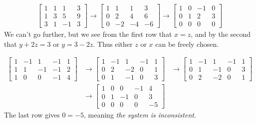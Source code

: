 \documentclass[a4paper,norsk,12pt]{article}
\begin{document}
\begin{align*}
    \left[
      \begin{array}{rrr|r}
        1 &  1 &  1 &  3 \\
        1 &  3 &  5 &  9 \\
        3 &  1 & -1 &  3
      \end{array}
    \right]
    \rightarrow
    \left[
      \begin{array}{rrr|r}
        1 &  1 &  1 &  3 \\
        0 &  2 &  4 &  6 \\
        0 & -2 & -4 & -6
      \end{array}
    \right]
    \rightarrow
    \left[
      \begin{array}{rrr|r}
        1 &  0 & -1 &  0 \\
        0 &  1 &  2 &  3 \\
        0 &  0 &  0 &  0
      \end{array}
    \right]
\end{align*}
We can't go further, but we see from the first row that $x=z$, and by the
second that $y+2z=3$ or $y=3-2z$. Thus either $z$ or $x$ can be freely chosen.

\begin{align*}
    \left[
      \begin{array}{rrrr|r}
        1 & -1 &  1 & -1 &  1 \\
        1 &  1 & -1 & -1 &  2 \\
        1 &  0 &  0 & -1 &  4
      \end{array}
    \right]
    & \rightarrow
    \left[
      \begin{array}{rrrr|r}
        1 & -1 &  1 & -1 &  1 \\
        0 &  2 & -2 &  0 &  1 \\
        0 &  1 & -1 &  0 &  3
      \end{array}
    \right]
    & \rightarrow
    \left[
      \begin{array}{rrrr|r}
        1 & -1 &  1 & -1 &  1 \\
        0 &  1 & -1 &  0 &  3 \\
        0 &  2 & -2 &  0 &  1
      \end{array}
    \right]
    \\
    & \rightarrow
    \left[
      \begin{array}{rrrr|r}
        1 &  0 &  0 & -1 &  4 \\
        0 &  1 & -1 &  0 &  3 \\
        0 &  0 &  0 &  0 & -5
      \end{array}
    \right]
\end{align*}
The last row gives $0=-5$, meaning \textit{the system is inconsistent}.
\end{document}
